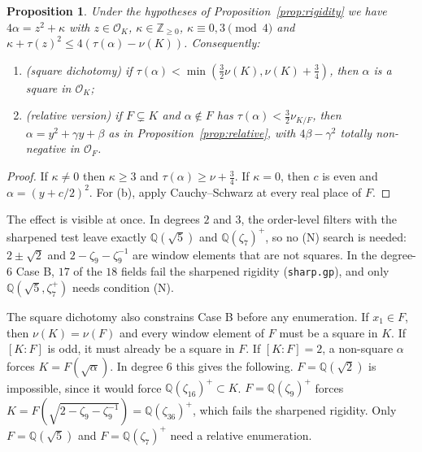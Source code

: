 \documentclass[11pt]{amsart}
\newtheorem{proposition}[theorem]{Proposition}
\theoremstyle{definition}
\newcommand{\OK}{\mathcal{O}_K}
\newcommand{\OF}{\mathcal{O}_F}
\newcommand{\Q}{\mathbb{Q}}
\newcommand{\Z}{\mathbb{Z}}
\newcommand{\nurel}{\nu_{K/F}}
\newcommand{\file}[1]{\texttt{#1}}
\begin{document}
\begin{proposition}\label{prop:sharp}
Under the hypotheses of Proposition~\ref{prop:rigidity} we have $4\alpha=z^2+\kappa$ with
$z\in\OK$, $\kappa\in\Z_{\ge0}$, $\kappa\equiv0,3\pmod4$ and
$\kappa+\tau(z)^2\le4(\tau(\alpha)-\nu(K))$.  Consequently:
\begin{enumerate}[label=(\alph*)]
\item\emph{(square dichotomy)} if $\tau(\alpha)<\min(\frac32\nu(K),\nu(K)+\frac34)$, then
  $\alpha$ is a square in $\OK$;
\item\emph{(relative version)} if $F\subsetneq K$ and $\alpha\notin F$ has
  $\tau(\alpha)<\frac32\nurel$, then $\alpha=y^2+\gamma y+\beta$ as in
  Proposition~\ref{prop:relative}, with $4\beta-\gamma^2$ totally non-negative in $\OF$.
\end{enumerate}
\end{proposition}

\begin{proof}
If $\kappa\ne0$ then $\kappa\ge3$ and $\tau(\alpha)\ge\nu+\frac34$.  If $\kappa=0$, then $c$ is
even and $\alpha=(y+c/2)^2$.  For (b), apply Cauchy--Schwarz at every real place of $F$.
\end{proof}

The effect is visible at once.  In degrees $2$ and $3$, the order-level filters with the
sharpened test leave exactly $\Q(\sqrt5)$ and $\Q(\zeta_7)^+$, so no (N) search is needed:
$2\pm\sqrt2$ and $2-\zeta_9-\zeta_9^{-1}$ are window elements that are not squares.  In the
degree-$6$ Case B, $17$ of the $18$ fields fail the sharpened rigidity (\file{sharp.gp}), and
only $\Q(\sqrt5,\zeta_7^+)$ needs condition (N).

The square dichotomy also constrains Case B before any enumeration.  If $x_1\in F$, then
$\nu(K)=\nu(F)$ and every window element of $F$ must be a square in $K$.  If $[K:F]$ is odd,
it must already be a square in $F$.  If $[K:F]=2$, a non-square $\alpha$ forces $K=F(\sqrt\alpha)$.
In degree $6$ this gives the following.  $F=\Q(\sqrt2)$ is impossible, since it would force
$\Q(\zeta_{16})^+\subset K$.  $F=\Q(\zeta_9)^+$ forces
$K=F(\sqrt{2-\zeta_9-\zeta_9^{-1}})=\Q(\zeta_{36})^+$, which fails the sharpened rigidity.
Only $F=\Q(\sqrt5)$ and $F=\Q(\zeta_7)^+$ need a relative enumeration.
\end{document}
